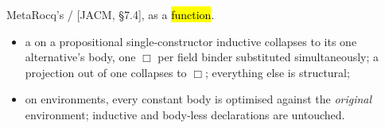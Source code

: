 \begin{definition}
\label{def:LBOptimize}
\leanok
{}
 MetaRocq's  /  [JACM, \S7.4], as a
\hl{function}.
\begin{itemize}
\item a  on a propositional single-constructor inductive collapses to its one alternative's
body, one $\Box$ per field binder substituted simultaneously; a projection out of one collapses to
$\Box$; everything else is structural;
\item on environments, every constant body is optimised against the \emph{original} environment;
inductive and body-less declarations are untouched.
\end{itemize}
\end{definition}

